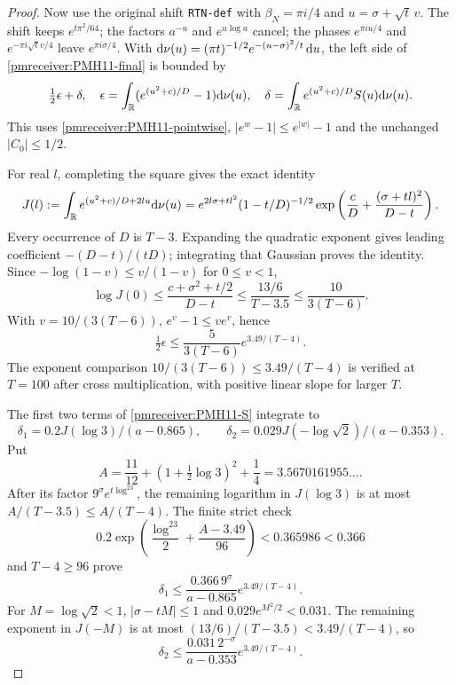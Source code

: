 \documentclass[11pt]{article}
\begin{document}
\begin{proof}
Now use the original shift \texttt{RTN-def} with $\beta_N=\pi i/4$
and $u=\sigma+\sqrt t\,v$. The shift keeps $e^{t\pi^2/64}$;
the factors $a^{-u}$ and $e^{u\log a}$ cancel; the phases
$e^{\pi iu/4}$ and $e^{-\pi i\sqrt t v/4}$ leave
$e^{\pi i\sigma/4}$. With
$\mathrm d\nu(u)=(\pi t)^{-1/2}e^{-(u-\sigma)^2/t}\,\mathrm d u$,
the left side of \eqref{pmreceiver:PMH11-final} is bounded by
\begin{equation}\label{pmreceiver:PMH11-epsdelta}
 \tfrac12\epsilon+\delta,\quad
 \epsilon=\int_\mathbb R(e^{(u^2+c)/D}-1)\mathrm d\nu(u),\quad
 \delta=\int_\mathbb R e^{(u^2+c)/D}S(u)\mathrm d\nu(u).
\end{equation}
This uses \eqref{pmreceiver:PMH11-pointwise}, $|e^w-1|\le e^{|w|}-1$ and
the unchanged $|C_0|\le1/2$.

For real $l$, completing the square gives the exact identity
\begin{equation}\label{pmreceiver:PMH11-Gaussian}
 J(l):=\int_\mathbb R e^{(u^2+c)/D+2lu}\mathrm d\nu(u)
 =e^{2l\sigma+tl^2}(1-t/D)^{-1/2}
       \exp\left(\frac cD+\frac{(\sigma+tl)^2}{D-t}\right).
\end{equation}
Every occurrence of $D$ is $T-3$. Expanding the quadratic exponent
gives leading coefficient $-(D-t)/(tD)$; integrating that Gaussian
proves the identity. Since $-\log(1-v)\le v/(1-v)$ for
$0\le v<1$,
\[
 \log J(0)\le\frac{c+\sigma^2+t/2}{D-t}
 \le\frac{13/6}{T-3.5}\le\frac{10}{3(T-6)}.
\]
With $v=10/(3(T-6))$, $e^v-1\le ve^v$, hence
\begin{equation}\label{pmreceiver:PMH11-epsilon}
 \tfrac12\epsilon\le\frac5{3(T-6)}e^{3.49/(T-4)}.
\end{equation}
The exponent comparison $10/(3(T-6))\le3.49/(T-4)$ is verified
at $T=100$ after cross multiplication, with positive linear slope
for larger $T$.

The first two terms of \eqref{pmreceiver:PMH11-S} integrate to
\[\delta_1=0.2J(\log3)/(a-0.865),\qquad
\delta_2=0.029J(-\log\sqrt2)/(a-0.353).\]
Put
\[
 A=\frac{11}{12}+(1+\tfrac12\log3)^2+\frac14
       =3.5670161955\ldots.
\]
After its factor $9^\sigma e^{t\log^23}$, the remaining
logarithm in $J(\log3)$ is at most
$A/(T-3.5)\le A/(T-4)$. The finite strict check
\begin{equation}\label{pmreceiver:PMH11-absorb}
 0.2\exp\left(\frac{\log^23}{2}+\frac{A-3.49}{96}\right)
 <0.365986<0.366
\end{equation}
and $T-4\ge96$ prove
\[
 \delta_1\le\frac{0.366\,9^\sigma}{a-0.865}e^{3.49/(T-4)}.
\]
For $M=\log\sqrt2<1$, $|\sigma-tM|\le1$ and
$0.029e^{M^2/2}<0.031$. The remaining exponent in $J(-M)$ is
at most $(13/6)/(T-3.5)<3.49/(T-4)$, so
\[
 \delta_2\le\frac{0.031\,2^{-\sigma}}{a-0.353}e^{3.49/(T-4)}.
\]


\end{proof}
\end{document}
